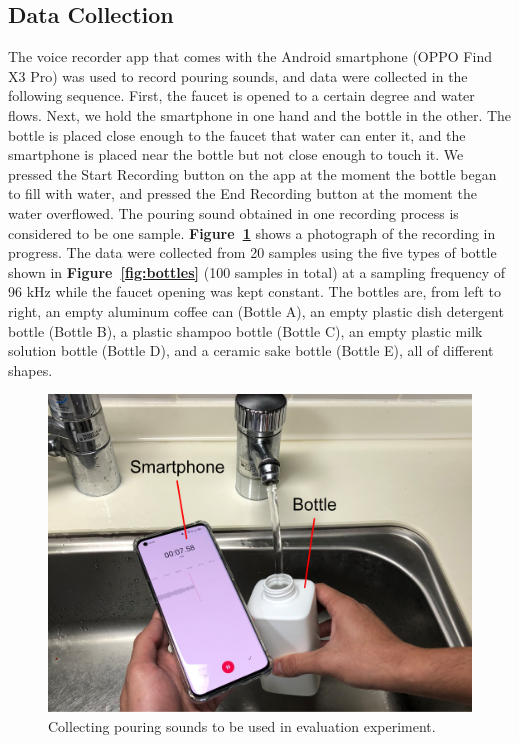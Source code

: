 \documentclass[sigconf]{acmart}
\newcommand\figref[1]{\textbf{Figure~\ref{fig:#1}}}
\begin{document}
\subsection{Data Collection}
The voice recorder app that comes with the Android smartphone (OPPO Find X3 Pro) was used to record pouring sounds, and data were collected in the following sequence. First, the faucet is opened to a certain degree and water flows. Next, we hold the smartphone in one hand and the bottle in the other. The bottle is placed close enough to the faucet that water can enter it, and the smartphone is placed near the bottle but not close enough to touch it. We pressed the Start Recording button on the app at the moment the bottle began to fill with water, and pressed the End Recording button at the moment the water overflowed. The pouring sound obtained in one recording process is considered to be one sample. \figref{data_acquisition} shows a photograph of the recording in progress. The data were collected from 20 samples using the five types of bottle shown in \figref{bottles} (100 samples in total) at a sampling frequency of 96 kHz while the faucet opening was kept constant. The bottles are, from left to right, an empty aluminum coffee can (Bottle A), an empty plastic dish detergent bottle (Bottle B), a plastic shampoo bottle (Bottle C), an empty plastic milk solution bottle (Bottle D), and a ceramic sake bottle (Bottle E), all of different shapes.

\begin{figure}[!t]
  \centering
  \includegraphics[width=1\linewidth]{figures/data_acquisition.eps}
  \caption{Collecting pouring sounds to be used in evaluation experiment.}
  \label{fig:data_acquisition}
\end{figure}
\end{document}
